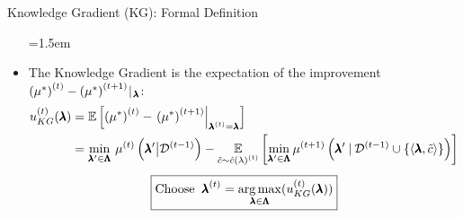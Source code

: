 \begin{frame}[c]{Knowledge Gradient (KG): Formal Definition}
\begin{itemize}\belowdisplayskip=1.5em
    
    \item The Knowledge Gradient is the \alert{expectation of the improvement $\iter[\bocount]{\left(\mean^*\right)} - \iter[\bocount+1]{\left(\mean^*\right)} \!\given_{\!\conf}$}:
    \[
    \begin{split}
        \iter{\acq}_{KG}(\conf) 
        &= \E\left[ \iter{\left(\mean^*\right)} - \left. \iter[\bocount+1]{\left(\mean^*\right)} \right|_{\bonextsample=\conf} \right]\\
        &=\min_{\conf'\in\pcs} \, \iter{\mean} \left(\conf' \big| \iter[\bocount-1]{\dataset} \right)
        - \E_{\tilde{\cost} \sim \iter[\bocount]{\surro(\lambda)}}
        \left[\min_{\conf'\in\pcs}\iter[\bocount+1]{\mean}\left(\conf'\given{\iter[\bocount-1]{\dataset} \cup \left\{\left\langle\conf, \tilde{\cost} \right\rangle \right\}}\right)\right]
    \end{split}
    \]
\pause
\bigskip
\[
    \boxed{\text{Choose}\;\;\bonextsample = \argmax_{\conf\in\pcs}(\iter{\acq}_{KG}(\conf))}
    \]
\end{itemize}
\end{frame}



